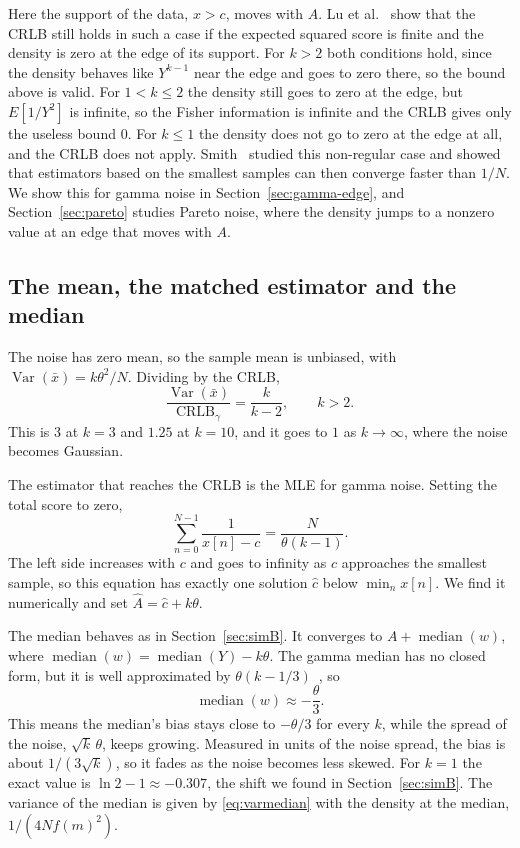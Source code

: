 \documentclass[11pt]{article}
\numberwithin{figure}{section}
\numberwithin{equation}{section}
\begin{document}
Here the support of the data, $x > c$, moves with $A$. Lu et al.~\cite{lu2025} show that the CRLB
still holds in such a case if the expected squared score is finite and the density is zero at the
edge of its support. For $k > 2$ both conditions hold, since the density behaves like $Y^{k-1}$ near
the edge and goes to zero there, so the bound above is valid. For $1 < k \leq 2$ the density still
goes to zero at the edge, but $E[1/Y^2]$ is infinite, so the Fisher information is infinite and the
CRLB gives only the useless bound $0$. For $k \leq 1$ the density does not go to zero at the edge at
all, and the CRLB does not apply. Smith~\cite{smith} studied this non-regular case and showed that estimators based on the
smallest samples can then converge faster than $1/N$. We show this for gamma noise in
Section~\ref{sec:gamma-edge}, and Section~\ref{sec:pareto} studies Pareto noise, where the density
jumps to a nonzero value at an edge that moves with $A$.

\subsection{The mean, the matched estimator and the median}

The noise has zero mean, so the sample mean is unbiased, with $\operatorname{Var}(\bar x) = k\theta^2/N$.
Dividing by the CRLB,
\[
  \boxed{\frac{\operatorname{Var}(\bar x)}{\text{CRLB}_\gamma} = \frac{k}{k-2}}, \qquad k > 2 .
\]
This is $3$ at $k = 3$ and $1.25$ at $k = 10$, and it goes to $1$ as $k \to \infty$, where the noise
becomes Gaussian.

The estimator that reaches the CRLB is the MLE for gamma noise. Setting the total score to zero,
\[
  \sum_{n=0}^{N-1} \frac{1}{x[n] - c} = \frac{N}{\theta(k-1)} .
\]
The left side increases with $c$ and goes to infinity as $c$ approaches the smallest sample, so
this equation has exactly one solution $\hat c$ below $\min_n x[n]$. We find it numerically and set
$\hat A = \hat c + k\theta$.

The median behaves as in Section~\ref{sec:simB}. It converges to $A + \operatorname{median}(w)$, where
$\operatorname{median}(w) = \operatorname{median}(Y) - k\theta$. The gamma median has no closed form, but
it is well approximated by $\theta(k - 1/3)$~\cite{chenrubin}, so
\[
  \operatorname{median}(w) \approx -\frac{\theta}{3} .
\]
This means the median's bias stays close to $-\theta/3$ for every $k$, while the spread of the noise,
$\sqrt{k}\,\theta$, keeps growing. Measured in units of the noise spread, the bias is about
$1/(3\sqrt{k})$, so it fades as the noise becomes less skewed. For $k = 1$ the exact value is
$\ln 2 - 1 \approx -0.307$, the shift we found in Section~\ref{sec:simB}. The variance of the median is
given by \eqref{eq:varmedian} with the density at the median, $1/(4N f(m)^2)$.
\end{document}
